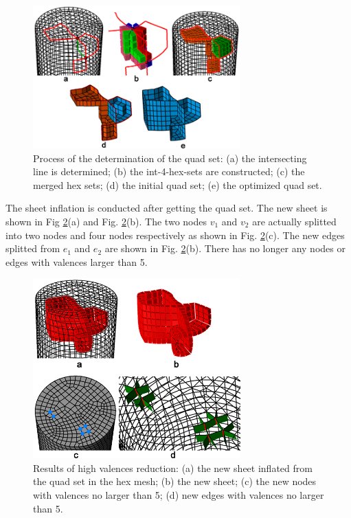 \documentclass[final,5p,times,twocolumn]{elsarticle}
\begin{document}
\begin{figure}[htbp]
\begin{center}
\includegraphics[width=8cm]{exam2_quad_set.png}
\caption{Process of the determination of the quad set: (a) the intersecting line is determined; (b) the int-4-hex-sets are constructed; (c) the merged hex sets; (d) the initial quad set; (e) the optimized quad set.}
\label{fig:exam2_quad_set}
\end{center}
\end{figure}

The sheet inflation is conducted after getting the quad set. The new sheet is shown in Fig \ref{fig:exam2_sheet}(a) and Fig. \ref{fig:exam2_sheet}(b). The two nodes $v_1$ and $v_2$ are actually splitted into two nodes and four nodes respectively as shown in Fig. \ref{fig:exam2_sheet}(c). The new edges splitted from $e_1$ and $e_2$ are shown in Fig. \ref{fig:exam2_sheet}(b). There has no longer any nodes or edges with valences larger than 5.

\begin{figure}[htbp]
\begin{center}
\includegraphics[width=8cm]{exam2_sheet.png}
\caption{Results of high valences reduction: (a) the new sheet inflated from the quad set in the hex mesh; (b) the new sheet; (c) the new nodes with valences no larger than 5; (d) new edges with valences no larger than 5.}
\label{fig:exam2_sheet}
\end{center}
\end{figure}
\end{document}

